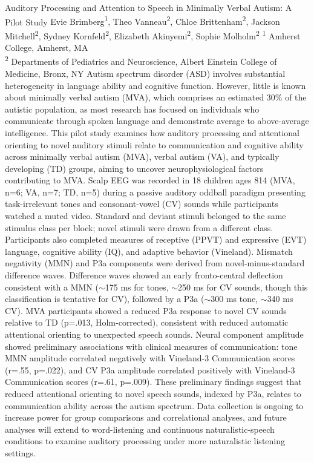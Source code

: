 \makeabstract
    {
    Auditory Processing and Attention to Speech in Minimally Verbal Autism: A Pilot Study
    }
    {
    Evie Brimberg\textsuperscript{1}, Theo Vanneau\textsuperscript{2}, Chloe Brittenham\textsuperscript{2}, Jackson Mitchell\textsuperscript{2}, Sydney Kornfeld\textsuperscript{2}, Elizabeth Akinyemi\textsuperscript{2}, Sophie Molholm\textsuperscript{2}
    }
    {
    \textsuperscript{1} Amherst College, Amherst, MA\\
\textsuperscript{2} Departments of Pediatrics and Neuroscience, Albert Einstein College of Medicine, Bronx, NY
    }
    {
    Autism spectrum disorder (ASD) involves substantial heterogeneity in language ability and cognitive function. However, little is known about minimally verbal autism (MVA), which comprises an estimated 30\% of the autistic population, as most research has focused on individuals who communicate through spoken language and demonstrate average to above-average intelligence. This pilot study examines how auditory processing and attentional orienting to novel auditory stimuli relate to communication and cognitive ability across minimally verbal autism (MVA), verbal autism (VA), and typically developing (TD) groups, aiming to uncover neurophysiological factors contributing to MVA.
    }
    {
    Scalp EEG was recorded in 18 children ages 8{\textendash}14 (MVA, n=6; VA, n=7; TD, n=5) during a passive auditory oddball paradigm presenting task-irrelevant tones and consonant-vowel (CV) sounds while participants watched a muted video. Standard and deviant stimuli belonged to the same stimulus class per block; novel stimuli were drawn from a different class. Participants also completed measures of receptive (PPVT) and expressive (EVT) language, cognitive ability (IQ), and adaptive behavior (Vineland). Mismatch negativity (MMN) and P3a components were derived from novel-minus-standard difference waves.
    }
    {
    Difference waves showed an early fronto-central deflection consistent with a MMN ($\sim$175 ms for tones, $\sim$250 ms for CV sounds, though this classification is tentative for CV), followed by a P3a ($\sim$300 ms tone, $\sim$340 ms CV). MVA participants showed a reduced P3a response to novel CV sounds relative to TD (p=.013, Holm-corrected), consistent with reduced automatic attentional orienting to unexpected speech sounds. Neural component amplitude showed preliminary associations with clinical measures of communication: tone MMN amplitude correlated negatively with Vineland-3 Communication scores (r={\textendash}.55, p=.022), and CV P3a amplitude correlated positively with Vineland-3 Communication scores (r=.61, p=.009). 
    }
    {
    These preliminary findings suggest that reduced attentional orienting to novel speech sounds, indexed by P3a, relates to communication ability across the autism spectrum. Data collection is ongoing to increase power for group comparisons and correlational analyses, and future analyses will extend to word-listening and continuous naturalistic-speech conditions to examine auditory processing under more naturalistic listening settings.
    }

    \newpage
    